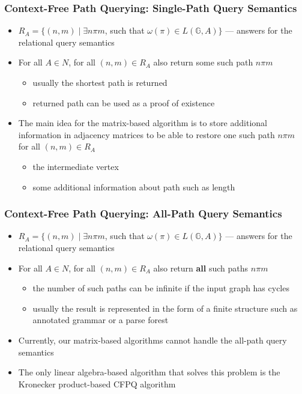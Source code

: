\documentclass[xcolor=table]{beamer}
\begin{document}
\begin{frame}[fragile]
\frametitle{Context-Free Path Querying: Single-Path Query Semantics}
\begin{itemize}
	\item $R_A = \{ (n, m) \mid \exists n \pi m$, such that $\omega(\pi) \in L(\mathbb{G},A)\}$ --- answers for the relational query semantics
	\pause
	\item For all $A \in N$, for all $(n,m) \in R_A$ also return some such path $n\pi m$
	\begin{itemize}
		\item usually the shortest path is returned
		\item returned path can be used as a proof of existence
	\end{itemize}
	\pause
	\item The main idea for the matrix-based algorithm is to store additional information in adjacency matrices to be able to restore one such path $n \pi m$ for all $(n,m) \in R_A$
	\begin{itemize}
		\item the intermediate vertex
		\item some additional information about path such as length
	\end{itemize}
	
\end{itemize}
\end{frame}

\begin{frame}[fragile]
	\frametitle{Context-Free Path Querying: All-Path Query Semantics}
	\begin{itemize}
		\item $R_A = \{ (n, m) \mid \exists n \pi m$, such that $\omega(\pi) \in L(\mathbb{G},A)\}$ --- answers for the relational query semantics
		\pause
		\item For all $A \in N$, for all $(n,m) \in R_A$ also return \textbf{all} such paths $n\pi m$
		\begin{itemize}
			\item the number of such paths can be infinite if the input graph has cycles
			\item usually the result is represented in the form of a finite structure such as annotated grammar or a parse forest
		\end{itemize}
		\pause
		\item Currently, our matrix-based algorithms cannot handle the all-path query semantics
		
		\item The only linear algebra-based algorithm that solves this problem is the Kronecker product-based CFPQ algorithm
		
	\end{itemize}
\end{frame}
\end{document}
